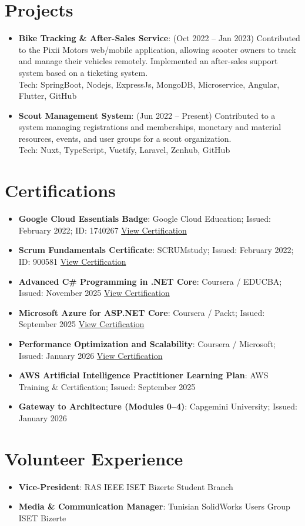 \documentclass[a4paper,20pt]{article}
\newcommand{\resumeItem}[2]{
  \item\small{
    \textbf{#1}{: #2 \vspace{-2pt}}
  }
}
\newcommand{\resumeSubItem}[2]{\resumeItem{#1}{#2}\vspace{-3pt}}
\newcommand{\resumeSubHeadingListStart}{\begin{itemize}[leftmargin=*]}
\newcommand{\resumeSubHeadingListEnd}{\end{itemize}}
\begin{document}
\vspace{-5pt}
\section{Projects}
\resumeSubHeadingListStart
\resumeSubItem{Bike Tracking \& After-Sales Service}{(Oct 2022 -- Jan 2023)
 Contributed to the Pixii Motors web/mobile application, allowing scooter owners to track and manage their vehicles remotely. Implemented an after-sales support system based on a ticketing system.
\\ Tech: SpringBoot, Nodejs, ExpressJs, MongoDB, Microservice, Angular, Flutter, GitHub}
\vspace{2pt}
\resumeSubItem{Scout Management System}{(Jun 2022 -- Present)
 Contributed to a system managing registrations and memberships, monetary and material resources, events, and user groups for a scout organization.
\\ Tech: Nuxt, TypeScript, Vuetify, Laravel, Zenhub, GitHub}
\resumeSubHeadingListEnd

\vspace{-5pt}
\section{Certifications}
\resumeSubHeadingListStart
\resumeSubItem{Google Cloud Essentials Badge}
    {Google Cloud Education; Issued: February 2022; ID: 1740267}
    {\href{https://www.cloudskillsboost.google/public_profiles/b6cf5253-6dac-4b50-8a0d-7129daad930b/badges/1740267}{View Certification}}
\resumeSubItem{Scrum Fundamentals Certificate}
    {SCRUMstudy; Issued: February 2022; ID: 900581}
    {\href{https://c46e136a583f7e334124-ac22991740ab4ff17e21daf2ed577041.ssl.cf1.rackcdn.com/Certificate/ScrumFundamentalsCertified-MohamedYoussefChlendi-900581.pdf}{View Certification}}
\resumeSubItem{Advanced C\# Programming in .NET Core}
    {Coursera / EDUCBA; Issued: November 2025}
    {\href{https://coursera.org/verify/AHZ3PB7VHVW0}{View Certification}}
\resumeSubItem{Microsoft Azure for ASP.NET Core}
    {Coursera / Packt; Issued: September 2025}
    {\href{https://coursera.org/verify/HTH0OZA64L2Z}{View Certification}}
\resumeSubItem{Performance Optimization and Scalability}
    {Coursera / Microsoft; Issued: January 2026}
    {\href{https://coursera.org/verify/QW1S6J4EDX8C}{View Certification}}
\resumeSubItem{AWS Artificial Intelligence Practitioner Learning Plan}
    {AWS Training \& Certification; Issued: September 2025}{}
\resumeSubItem{Gateway to Architecture (Modules 0--4)}
    {Capgemini University; Issued: January 2026}{}
\resumeSubHeadingListEnd

\vspace{-2pt}
\section{Volunteer Experience}
\resumeSubHeadingListStart
\resumeItem{Vice-President}{RAS IEEE ISET Bizerte Student Branch}
\resumeItem{Media \& Communication Manager}{Tunisian SolidWorks Users Group ISET Bizerte}
\resumeSubHeadingListEnd
\end{document}
